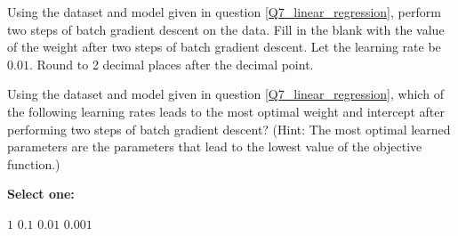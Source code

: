 \documentclass[11pt,addpoints,answers]{exam}
\numberwithin{equation}{section} %
\numberwithin{figure}{section} %
\numberwithin{table}{section} %
\begin{document}
\begin{questions}
    \newpage
    \question[2] Using the dataset and model given in question \ref{Q7_linear_regression}, perform two steps of batch gradient descent on the data. Fill in the blank with the value of the weight after two steps of batch gradient descent. Let the learning rate be $0.01$. Round to 2 decimal places after the decimal point.
    
    \begin{tcolorbox}[fit,height=1cm, width=4cm, blank, borderline={1pt}{-2pt},nobeforeafter, top=2pt, left=2pt, right=2pt, bottom=2pt]
    \end{tcolorbox}
    
    
    
    \question[2]  Using the dataset and model given in question \ref{Q7_linear_regression}, which of the following learning rates leads to the most optimal weight and intercept after performing two steps of batch gradient descent? (Hint: The most optimal learned parameters are the parameters that lead to the lowest value of the objective function.)
    
    \textbf{Select one:}
    \begin{checkboxes}
        \choice $1$
        \choice $0.1$
        \choice $0.01$
        \choice $0.001$
    \end{checkboxes}
    
    
    

    \clearpage
\end{questions}


\clearpage

\end{document}
